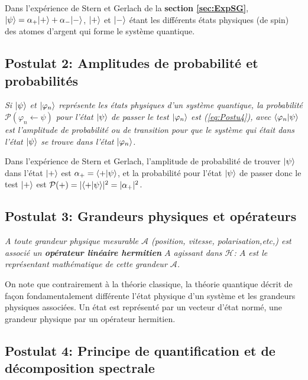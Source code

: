 Dans l'expérience de Stern et Gerlach de la \textbf{section \ref{sec:ExpSG}},
$\vert\psi\rangle=\alpha_{+}\vert+\rangle+\alpha_{-}\vert-\rangle$, $\vert+\rangle$ et $\vert-\rangle$ étant
les différents états physiques (de spin) des atomes d'argent qui forme le
système quantique.

\subsection{Postulat 2: Amplitudes de probabilité et probabilités}

\colorbox[gray]{0.8}{
\parbox[c]{0.9\textwidth}{
\emph{Si $\vert\psi\rangle$ et $\vert\varphi_n\rangle $ représente les états physiques
d'un système quantique, la probabilité $\mathcal{P}(\varphi_n \leftarrow\psi)$
pour l'état $\vert\psi\rangle$ de passer le test $\vert\varphi_n\rangle$ est
(\ref{eq:Postu4}), avec $\langle\varphi_n\vert\psi\rangle$ est l'amplitude de
probabilité ou de transition pour que le système qui était dans l'état
$\vert\psi\rangle$ se trouve dans l'état $\vert\varphi_n\rangle$.}
}}
\medskip

Dans l'expérience de Stern et Gerlach, l'amplitude de probabilité de trouver
$\vert\psi\rangle$ dans l'état $\vert+\rangle$ est $\alpha_{+}=\langle+\vert\psi\rangle$,
et la probabilité pour l'état $\vert\psi\rangle$ de passer donc le test $\vert+\rangle$ est
$\mathcal{P}(+)  =|\langle+\vert\psi\rangle|^{2}=|\alpha_{+}|^{2}$.

\subsection{Postulat 3: Grandeurs physiques et opérateurs}

\colorbox[gray]{0.8}{
\parbox[c]{0.9\textwidth}{
\emph{A toute grandeur physique mesurable $\mathcal{A}$ (position, vitesse,
polarisation,etc,) est associé un \textbf{opérateur linéaire hermitien} $A$
agissant dans $\mathcal{H}$: $A$ est le représentant mathématique de cette
grandeur $\mathcal{A}$.}
}}
\medskip

On note que contrairement à la théorie classique, la théorie quantique décrit
de façon fondamentalement différente l'état physique d'un système et les
grandeurs physiques associées. Un état est représenté par un vecteur d'état
normé, une grandeur physique par un opérateur hermitien.

\subsection{Postulat 4: Principe de quantification et de décomposition
spectrale}

